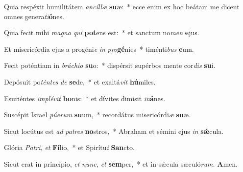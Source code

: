 \item Quia respéxit humilitátem \textit{ancíllæ} \textbf{su}æ:~* ecce enim ex hoc beátam me dicent omnes genera\tinyhspace\textit{ti}\textbf{ó}nes.
\item Quia fecit mihi \textit{magna} \textit{qui} \textbf{pot}ens est:~* et sanctum no\textit{men} \textbf{e}jus.
\item Et misericórdia ejus a progéni\textit{e} \textit{in} \textit{pro}\textbf{gé}nies~* timénti\textit{bus} \textbf{e}um.
\item Fecit poténtiam in \textit{bráchio} \textbf{su}o:~* dispérsit supérbos mente cor\textit{dis} \textbf{su}i.
\item Depósuit po\textit{téntes} \textit{de} \textbf{se}de,~* et exaltá\textit{vit} \textbf{hú}miles.
\item Esuriéntes \textit{implévit} \textbf{bo}nis:~* et dívites dimísit \textit{in}\textbf{á}nes.
\item Suscépit Israel \textit{púerum} \textbf{su}um,~* recordátus misericórdi\tinyhspace\textit{æ} \textbf{su}æ.
\item Sicut locútus est \textit{ad} \textit{patres} \textbf{no}stros,~* Abraham et sémini ejus \textit{in} \textbf{sǽ}cula.
\item Glória \textit{Patri,} \textit{et} \textbf{Fí}lio,~* et Spirítu\tinyhspace\textit{i} \textbf{San}cto.
\item Sicut erat in princípio, \textit{et} \textit{nunc,} \textit{et} \textbf{sem}per,~* et in sǽcula sæculó\textit{rum.} \textbf{A}men.